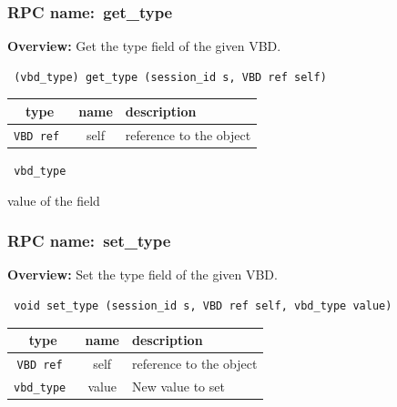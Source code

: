 \vspace{0.3cm}
\vspace{0.3cm}
\vspace{0.3cm}
\subsubsection{RPC name:~get\_type}

{\bf Overview:} 
Get the type field of the given VBD.

\begin{verbatim} (vbd_type) get_type (session_id s, VBD ref self)\end{verbatim}



 
\vspace{0.3cm}
\begin{tabular}{|c|c|p{7cm}|}
 \hline
{\bf type} & {\bf name} & {\bf description} \\ \hline
{\tt VBD ref } & self & reference to the object \\ \hline 

\end{tabular}

\vspace{0.3cm}

{\tt 
vbd\_type
}


value of the field
\vspace{0.3cm}
\vspace{0.3cm}
\vspace{0.3cm}
\subsubsection{RPC name:~set\_type}

{\bf Overview:} 
Set the type field of the given VBD.

\begin{verbatim} void set_type (session_id s, VBD ref self, vbd_type value)\end{verbatim}



 
\vspace{0.3cm}
\begin{tabular}{|c|c|p{7cm}|}
 \hline
{\bf type} & {\bf name} & {\bf description} \\ \hline
{\tt VBD ref } & self & reference to the object \\ \hline 

{\tt vbd\_type } & value & New value to set \\ \hline 

\end{tabular}

